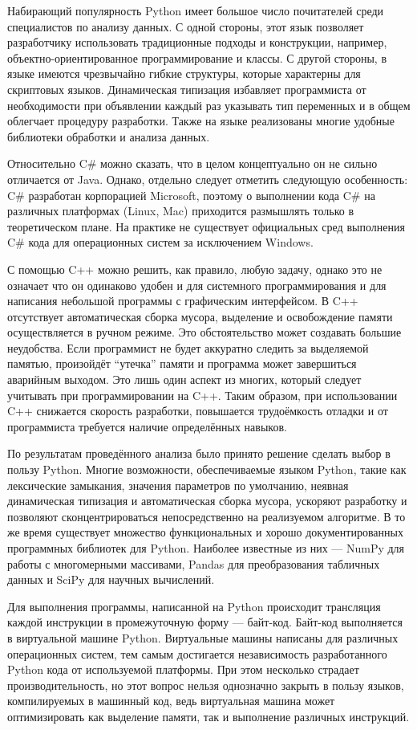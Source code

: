 \documentclass[12pt]{diploma}
\begin{document}
	
	Набирающий популярность Python имеет большое число почитателей среди специалистов по анализу данных. С одной стороны, этот язык позволяет разработчику использовать традиционные подходы и конструкции, например, объектно-ориентированное программирование и классы. С другой стороны, в языке имеются чрезвычайно гибкие структуры, которые характерны для скриптовых языков. Динамическая типизация избавляет программиста от необходимости при объявлении каждый раз указывать тип переменных и в общем облегчает процедуру разработки. Также на языке реализованы многие удобные библиотеки обработки и анализа данных.
	
	Относительно C\# можно сказать, что в целом концептуально он не сильно отличается от Java. Однако, отдельно следует отметить следующую особенность: C\# разработан корпорацией Microsoft, поэтому о выполнении кода C\# на различных платформах (Linux, Mac) приходится размышлять только в теоретическом плане. На практике не существует официальных сред выполнения C\# кода для операционных систем за исключением Windows.
	
	С помощью C++ можно решить, как правило, любую задачу, однако это не означает что он одинаково удобен и для системного программирования и для написания небольшой программы с графическим интерфейсом. В C++ отсутствует автоматическая сборка мусора, выделение и освобождение памяти осуществляется в ручном режиме. Это обстоятельство может создавать большие неудобства. Если программист не будет аккуратно следить за выделяемой памятью, произойдёт ``утечка'' памяти и программа может завершиться аварийным выходом. Это лишь один аспект из многих, который следует учитывать при программировании на C++. Таким образом, при использовании C++ снижается скорость разработки, повышается трудоёмкость отладки и от программиста требуется наличие определённых навыков.
	
	По результатам проведённого анализа было принято решение сделать выбор в пользу Python. Многие возможности, обеспечиваемые языком Python, такие как лексические замыкания, значения параметров по умолчанию, неявная динамическая типизация и автоматическая сборка мусора, ускоряют разработку и позволяют сконцентрироваться непосредственно на реализуемом алгоритме. В то же время существует множество функциональных и хорошо документированных программных библиотек для Python. Наиболее известные из них --- NumPy для работы с многомерными массивами, Pandas для преобразования табличных данных и SciPy для научных вычислений.
	
	Для выполнения программы, написанной на Python происходит трансляция каждой инструкции в промежуточную форму --- байт-код. Байт-код выполняется в виртуальной машине Python. Виртуальные машины написаны для различных операционных систем, тем самым достигается независимость разработанного Python кода от используемой платформы. При этом несколько страдает производительность, но этот вопрос нельзя однозначно закрыть в пользу языков, компилируемых в машинный код, ведь виртуальная машина может оптимизировать как выделение памяти, так и выполнение различных инструкций. 
	
\end{document}

